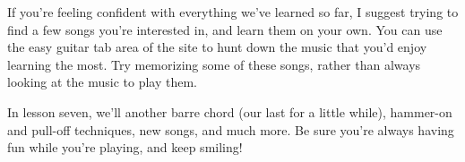 If you're feeling confident with everything we've learned so far, I suggest trying to find a few songs you're interested in, and learn them on your own. You can use the easy guitar tab area of the site to hunt down the music that you'd enjoy learning the most. Try memorizing some of these songs, rather than always looking at the music to play them.

In lesson seven, we'll another barre chord (our last for a little while), hammer-on and pull-off techniques, new songs, and much more. Be sure you're always having fun while you're playing, and keep smiling! 

